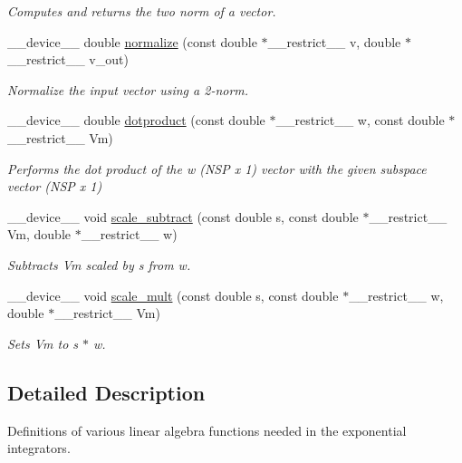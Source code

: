 \begin{DoxyCompactItemize}
\begin{DoxyCompactList}\small\item\em Computes and returns the two norm of a vector. \end{DoxyCompactList}\item 
\+\_\+\+\_\+device\+\_\+\+\_\+ double \hyperlink{exponential__linear__algebra_8cuh_ae01ed1392756734c2d6996554cb20176}{normalize} (const double $\ast$\+\_\+\+\_\+restrict\+\_\+\+\_\+ v, double $\ast$\+\_\+\+\_\+restrict\+\_\+\+\_\+ v\+\_\+out)
\begin{DoxyCompactList}\small\item\em Normalize the input vector using a 2-\/norm. \end{DoxyCompactList}\item 
\+\_\+\+\_\+device\+\_\+\+\_\+ double \hyperlink{exponential__linear__algebra_8cuh_a43b8d535f44e58015de9b6ea37561bd7}{dotproduct} (const double $\ast$\+\_\+\+\_\+restrict\+\_\+\+\_\+ w, const double $\ast$\+\_\+\+\_\+restrict\+\_\+\+\_\+ Vm)
\begin{DoxyCompactList}\small\item\em Performs the dot product of the w (N\+SP x 1) vector with the given subspace vector (N\+SP x 1) \end{DoxyCompactList}\item 
\+\_\+\+\_\+device\+\_\+\+\_\+ void \hyperlink{exponential__linear__algebra_8cuh_a6b815eec17077505cb9313d6c380e036}{scale\+\_\+subtract} (const double s, const double $\ast$\+\_\+\+\_\+restrict\+\_\+\+\_\+ Vm, double $\ast$\+\_\+\+\_\+restrict\+\_\+\+\_\+ w)
\begin{DoxyCompactList}\small\item\em Subtracts Vm scaled by s from w. \end{DoxyCompactList}\item 
\+\_\+\+\_\+device\+\_\+\+\_\+ void \hyperlink{exponential__linear__algebra_8cuh_a5349e6f114398db5a19e212fc837f670}{scale\+\_\+mult} (const double s, const double $\ast$\+\_\+\+\_\+restrict\+\_\+\+\_\+ w, double $\ast$\+\_\+\+\_\+restrict\+\_\+\+\_\+ Vm)
\begin{DoxyCompactList}\small\item\em Sets Vm to s $\ast$ w. \end{DoxyCompactList}\end{DoxyCompactItemize}


\subsection{Detailed Description}
Definitions of various linear algebra functions needed in the exponential integrators. 


